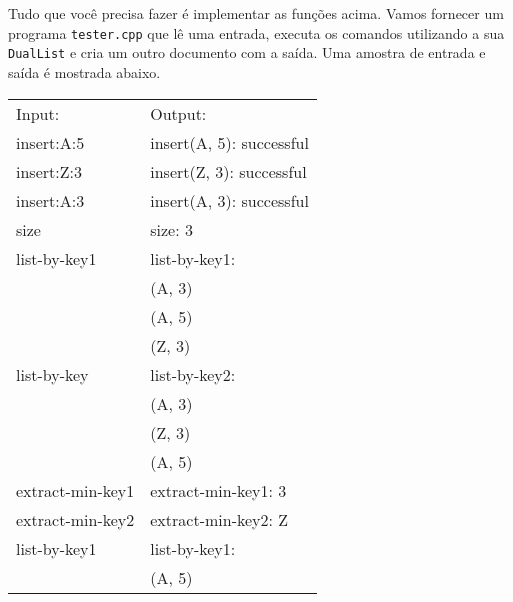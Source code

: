 \documentclass{article}
\begin{document}
Tudo que você precisa fazer é implementar as funções acima. Vamos fornecer um programa \texttt{tester.cpp} que lê uma entrada, executa os comandos utilizando a sua \texttt{DualList} e cria um outro documento com a saída. Uma amostra de entrada e saída é mostrada abaixo.


\begin{table}[h!]
\centering
\begin{tabular}{l|l}
Input:           & Output:                  \\
insert:A:5       & insert(A, 5): successful \\
insert:Z:3       & insert(Z, 3): successful \\
insert:A:3       & insert(A, 3): successful \\
size             & size: 3                  \\
list-by-key1     & list-by-key1:            \\
                 & (A, 3)                   \\
                 & (A, 5)                   \\
                 & (Z, 3)                   \\
list-by-key      & list-by-key2:            \\
                 & (A, 3)                   \\
                 & (Z, 3)                   \\
                 & (A, 5)                   \\
extract-min-key1 & extract-min-key1: 3      \\
extract-min-key2 & extract-min-key2: Z      \\
list-by-key1     & list-by-key1:            \\
                 & (A, 5)                  
\end{tabular}
\vspace{-0.5cm}
\end{table}
\end{document}
